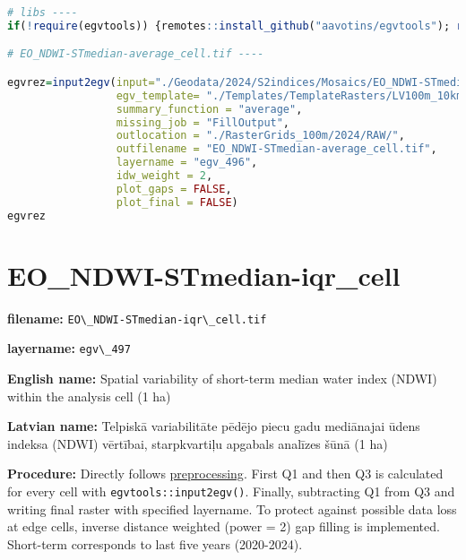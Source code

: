 \documentclass[
]{book}
\newcommand{\passthrough}[1]{#1}
\begin{document}
\begin{lstlisting}[language=R]
# libs ----
if(!require(egvtools)) {remotes::install_github("aavotins/egvtools"); require(egvtools)}

# EO_NDWI-STmedian-average_cell.tif ----

egvrez=input2egv(input="./Geodata/2024/S2indices/Mosaics/EO_NDWI-STmedian.tif",
                 egv_template= "./Templates/TemplateRasters/LV100m_10km.tif",
                 summary_function = "average",
                 missing_job = "FillOutput",
                 outlocation = "./RasterGrids_100m/2024/RAW/",
                 outfilename = "EO_NDWI-STmedian-average_cell.tif",
                 layername = "egv_496",
                 idw_weight = 2,
                 plot_gaps = FALSE,
                 plot_final = FALSE)
egvrez
\end{lstlisting}

\section{EO\_NDWI-STmedian-iqr\_cell}\label{ch06.497}

\textbf{filename:} \passthrough{\lstinline!EO\_NDWI-STmedian-iqr\_cell.tif!}

\textbf{layername:} \passthrough{\lstinline!egv\_497!}

\textbf{English name:} Spatial variability of short-term median water index (NDWI) within the analysis cell (1 ha)

\textbf{Latvian name:} Telpiskā variabilitāte pēdējo piecu gadu mediānajai ūdens indeksa (NDWI) vērtībai, starpkvartiļu apgabals analīzes šūnā (1 ha)

\textbf{Procedure:} Directly follows \hyperref[Ch04.13]{preprocessing}. First Q1 and then Q3
is calculated for every cell with \passthrough{\lstinline!egvtools::input2egv()!}. Finally, subtracting
Q1 from Q3 and writing final raster with specified layername. To protect against possible data loss at edge cells,
inverse distance weighted (power = 2) gap filling is implemented. Short-term corresponds
to last five years (2020-2024).
\end{document}
